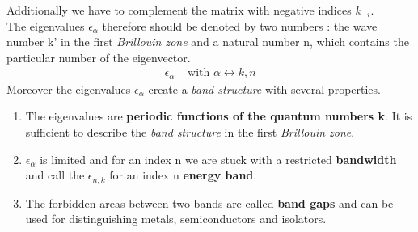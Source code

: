 		Additionally we have to complement the matrix with negative indices $k_{-i}$. \\
		The eigenvalues $\epsilon_\alpha$ therefore should be denoted by two numbers : the wave number k' in the first \textit{Brillouin zone} and a natural number n, which contains the particular number of the eigenvector.
		\begin{align}
			\epsilon_\alpha & \text{ with } \alpha \leftrightarrow k, n
		\end{align}	
		Moreover the eigenvalues $\epsilon_\alpha$ create a \textit{band structure} with several properties.
		\begin{enumerate}
			\item The eigenvalues are \textbf{periodic functions of the quantum numbers k}. It is sufficient to describe the \textit{band structure} in the first \textit{Brillouin zone}.
			\item $\epsilon_\alpha$ is limited and for an index n we are stuck with a restricted \textbf{bandwidth} and call the $\epsilon_{n, k}$ for an index n \textbf{energy band}.
			\item  The forbidden areas between two bands are called \textbf{band gaps} and can be used for distinguishing metals, semiconductors and isolators.
		\end{enumerate}
		
